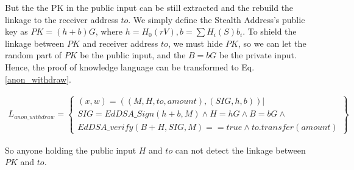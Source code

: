 But the the PK in the public input can be still extracted and the rebuild the linkage to the receiver address $to$.
We simply define the Stealth Address's public key as $PK = (h + b)G$, where $h = H_0(rV), b = \sum{H_i(S)b_i}$. To shield the linkage between $PK$ and receiver address $to$, we must hide $PK$, so we can let the random part of $PK$ be the public input, and the $B=bG$ be the private input. Hence, the proof of knowledge language can be transformed to Eq. \ref{anon_withdraw}.

\begin{equation}\label{anon_withdraw}
    \begin{aligned}
        L_{anon\_withdraw} = \left\{
                \begin{array}{c}
                        (x, w) = ((M, H, to, amount), (SIG, h, b)) | \\ 
                    SIG = EdDSA\_Sign(h+b, M) \land H = hG \land B = bG \land \\
                        EdDSA\_verify(B + H, SIG, M) == true \land to.transfer(amount)
                \end{array}    
                    \right\} 
    \end{aligned}
\end{equation}

So anyone holding the public input $H$ and $to$ can not detect the linkage between $PK$ and $to$.






